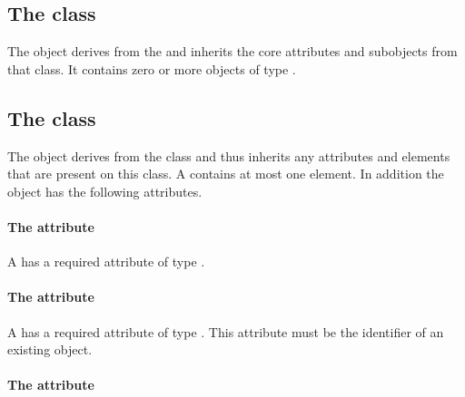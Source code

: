 \subsection{The  class}
\label{listofcsgobjects-class}


The \ListOfCSGObjects object derives from the  and inherits
the core attributes and subobjects from that class. It contains zero or
more objects of type \CSGObject.

\subsection{The  class}
\label{csgobject-class}




The \CSGObject object derives from the \SBase class and thus inherits
any attributes and elements that are present on this class.
A \CSGObject contains at most one \CSGNode element.
In addition the \CSGObject object has the following attributes.

\paragraph{The \fixttspace{} attribute}

A \CSGObject has a required attribute  of type .


\paragraph{The \fixttspace{} attribute}

A \CSGObject has a required attribute  of type
.
This attribute must be the identifier of an existing \DomainType object.


\paragraph{The \fixttspace{} attribute}

